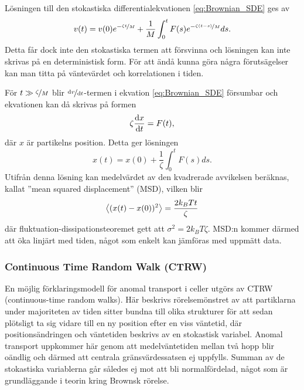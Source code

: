 Lösningen till den stokastiska differentialekvationen \eqref{eq:Brownian_SDE} ges av 
\begin{equation}
    v(t)=v(0)e^{-\nicefrac{\zeta t}{M}}+\frac{1}{M}\int^t_0 F(s)e^{-\nicefrac{\zeta (t-s)}{M}}ds.
\end{equation}
Detta får dock inte den stokastiska termen att försvinna och lösningen kan inte skrivas på en deterministisk form. För att ändå kunna göra några förutsägelser kan man titta på väntevärdet och korrelationen i tiden.

För $t \gg \nicefrac{\zeta}{M}$ blir $\nicefrac{\dd{v}}{\dd{t}}$-termen i ekvation \eqref{eq:Brownian_SDE} försumbar  och ekvationen kan då skrivas på formen
\begin{equation}
    \zeta \dv{x}{t}=F(t),
\end{equation}
där $x$ är partikelns position. Detta ger lösningen
\begin{equation}
    x(t)=x(0)+\frac{1}{\zeta} \int^t_0 F(s)ds.
\end{equation}
Utifrån denna lösning kan medelvärdet av den kvadrerade avvikelsen beräknas, kallat ''mean squared displacement'' (MSD), vilken blir 
\begin{equation}
    \ev{(x(t)-x(0))^2}=\frac{2k_BTt}{\zeta}
\end{equation}
där fluktuation-dissipationsteoremet gett att $\sigma^2=2k_BT\zeta$.  MSD:n kommer därmed att öka linjärt med tiden, något som enkelt kan jämföras med uppmätt data.



\subsubsection{Continuous Time Random Walk (CTRW)}
En möjlig förklaringsmodell för anomal transport
i celler utgörs av CTRW (continuous-time random
walks)\cite{Hofling&Franosch2013}. Här beskrivs rörelsemönstret av att
partiklarna under majoriteten av tiden sitter bundna till olika
strukturer för att sedan plötsligt ta sig vidare till en ny position
efter en viss väntetid, där positionsändringen och väntetiden beskrivs
av en stokastisk variabel. Anomal transport uppkommer här genom att
medelväntetiden mellan två hopp blir oändlig och därmed att centrala
gränsvärdessatsen ej uppfylls. Summan av de stokastiska variablerna
går således ej mot att bli normalfördelad, något som är grundläggande
i teorin kring Brownsk rörelse. 

